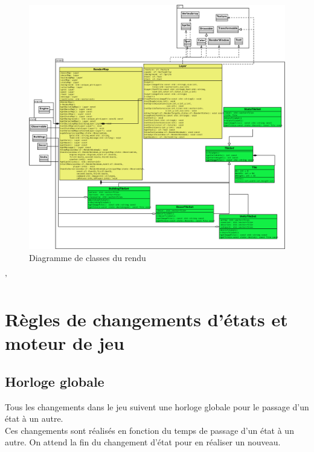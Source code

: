 \documentclass[12pt,a4paper]{article}
\begin{document}
\begin{figure}[!ht]
\centering
    \includegraphics[width=1\textwidth]{ressources/render.png}
     \caption{Diagramme de classes du rendu}
\end{figure}

\newpage
'
\newpage

\section{Règles de changements d'états et moteur de jeu}

\subsection{Horloge globale}
Tous les changements dans le jeu suivent une horloge globale pour le passage d'un état à un autre. \\
Ces changements sont réalisés en fonction du temps de passage d'un état à un autre. On attend la fin du changement d'état pour en réaliser un nouveau.
\end{document}
